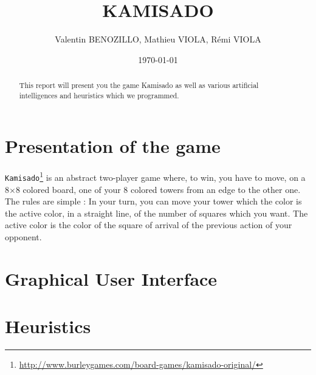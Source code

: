 \documentclass[a4paper, 11pt]{article}
\title{KAMISADO}
\author{Valentin BENOZILLO, Mathieu VIOLA, Rémi VIOLA}
\date{\today}
\begin{document}
\maketitle

\begin{abstract}
This report will present you the game Kamisado as well as various artificial intelligences and heuristics which we programmed.
\end{abstract}

\newpage

\tableofcontents

\newpage

\section{Presentation of the game}
\verb?Kamisado?\footnote{\url{http://www.burleygames.com/board-games/kamisado-original/}} is an abstract two-player game where, to win, you have to move, on a 8$\times$8 colored board, one of your 8 colored towers from an edge to the other one. The rules are simple : In your turn, you can move your tower which the color is the active color, in a straight line, of the number of squares which you want. The active color is the color of the square of arrival of the previous action of your opponent. 


\section{Graphical User Interface}


\section{Heuristics}
\end{document}
